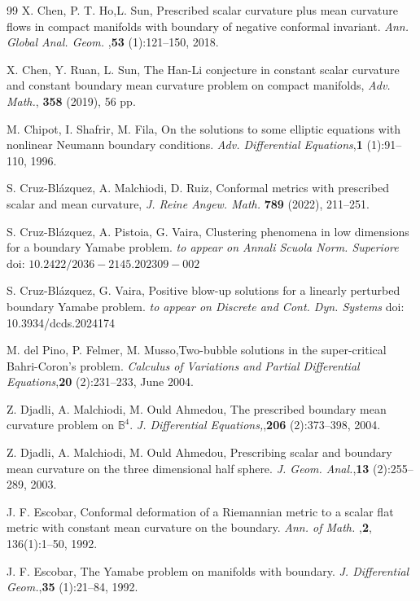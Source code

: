 \documentclass[11pt,a4paper]{amsart}
\begin{document}
\begin{thebibliography}{99}
X. Chen, P. T. Ho,L. Sun, Prescribed scalar curvature plus mean curvature flows in compact manifolds with boundary of negative conformal invariant. {\it Ann. Global Anal. Geom.
},{\bf 53} (1):121--150, 2018. 

X. Chen, Y. Ruan, L. Sun, The Han-Li conjecture in constant scalar curvature and constant boundary mean curvature problem on compact manifolds, {\it Adv. Math.}, {\bf 358 } (2019), 56 pp.

M. Chipot, I. Shafrir,  M. Fila, On the solutions to some elliptic equations with nonlinear Neumann boundary conditions. {\it  Adv. Differential Equations},{\bf 1} (1):91--110, 1996.

S. Cruz-Bl\'azquez, A. Malchiodi, D. Ruiz, Conformal metrics with prescribed scalar and mean curvature, {\it J. Reine Angew. Math. } {\bf 789} (2022), 211--251.

S. Cruz-Bl\'azquez, A. Pistoia, G. Vaira, Clustering phenomena in low dimensions for a boundary Yamabe problem. {\it to appear on Annali Scuola Norm. Superiore} doi: $10.2422/2036-2145.202309-002$

S. Cruz-Bl\'azquez, G. Vaira, Positive blow-up solutions for a linearly perturbed boundary Yamabe problem. {\it to appear on Discrete and Cont. Dyn. Systems} doi: 10.3934/dcds.2024174

M. del Pino, P. Felmer,  M. Musso,Two-bubble solutions in the super-critical Bahri-Coron's problem. {\it Calculus of Variations and Partial Differential Equations},{\bf 20} (2):231--233, June 2004. 

Z. Djadli, A. Malchiodi, M. Ould Ahmedou, The prescribed boundary mean curvature problem on $\mathbb B^4$. {\it J. Differential Equations,},{\bf 206} (2):373--398, 2004. 

Z. Djadli, A. Malchiodi, M. Ould Ahmedou, Prescribing scalar and boundary mean curvature on the three dimensional half sphere. {\it J. Geom. Anal.},{\bf13} (2):255--289, 2003. 

J. F. Escobar, Conformal deformation of a Riemannian metric to a scalar flat metric with constant mean curvature on the boundary. {\it Ann. of Math. },{\bf 2}, 136(1):1--50, 1992. 

J. F. Escobar, The Yamabe problem on manifolds with boundary. {\it J. Differential Geom.},{\bf 35} (1):21--84, 1992. 


\end{thebibliography}
\end{document}
